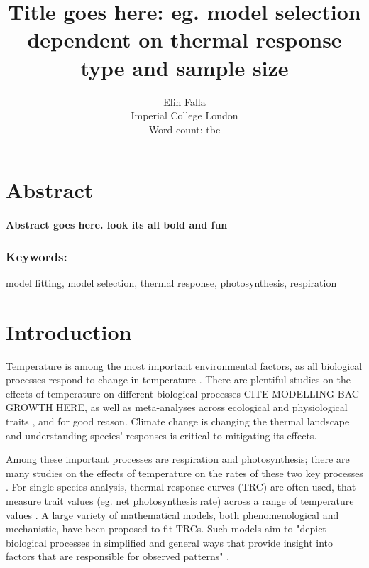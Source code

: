 \documentclass[11pt, a4paper]{article}
\begin{document}
\setlength{\parskip}{6pt}

\title{Title goes here: eg. model selection dependent on thermal response type and sample size}
\author{Elin Falla\\Imperial College London
\\ Word count: tbc}
\date{}
\maketitle
\pagebreak

\section*{Abstract}
\paragraph{Abstract goes here. look its all bold and fun}
\subsubsection*{Keywords:}
model fitting, model selection, thermal response, photosynthesis, respiration

\hrulefill

\section{Introduction}
Temperature is among the most important environmental factors, as all biological processes respond to change in temperature \cite{yanEquationModellingTemperature1999}. There are plentiful studies on the effects of temperature on different biological processes \cite{adamsModelFitBiological2017, krenekThermalPerformanceCurves2011, damosTemperatureDrivenModelsInsect2011} CITE MODELLING BAC GROWTH HERE, as well as meta-analyses across ecological and physiological traits \cite{dellSystematicVariationTemperature2011}, and for good reason. Climate change is changing the thermal landscape \cite{pachauriClimateChange20072008} and understanding species' responses is critical to mitigating its effects.

Among these important processes are respiration and photosynthesis; there are many studies on the effects of temperature on the rates of these two key processes \cite{MarineMesoherbivoreConsumption2016, sageTemperatureResponseC32007}. For single species analysis, thermal response curves (TRC) are often used, that measure trait values (eg. net photosynthesis rate) across a range of temperature values \cite{dellSystematicVariationTemperature2011}. A large variety of mathematical models, both phenomenological and mechanistic, have been proposed to fit TRCs. Such models aim to "depict biological processes in simplified and general ways that provide insight into factors that are responsible for observed patterns" \cite{johnsonModelSelectionEcology2004}.
\end{document}
